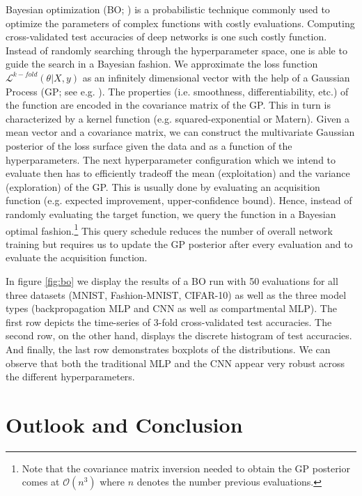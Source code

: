 \documentclass[colorinlistoftodos]{article}
\theoremstyle{definition}
\begin{document}
Bayesian optimization (BO; \citet{snoek_2012}) is a probabilistic technique commonly used to optimize the parameters of complex functions with costly evaluations. Computing cross-validated test accuracies of deep networks is one such costly function. Instead of randomly searching through the hyperparameter space, one is able to guide the search in a Bayesian fashion. We approximate the loss function $\mathcal{L}^{k-fold}(\theta|X, y)$ as an infinitely dimensional vector with the help of a Gaussian Process (GP; see e.g. \citet{rasmussen_2004}). The properties (i.e. smoothness, differentiability, etc.) of the function are encoded in the covariance matrix of the GP. This in turn is characterized by a kernel function (e.g. squared-exponential or Matern). Given a mean vector and a covariance matrix, we can construct the multivariate Gaussian posterior of the loss surface given the data and as a function of the hyperparameters. 
The next hyperparameter configuration which we intend to evaluate then has to efficiently tradeoff the mean (exploitation) and the variance (exploration) of the GP. This is usually done by evaluating an acquisition function (e.g. expected improvement, upper-confidence bound). Hence, instead of randomly evaluating the target function, we query the function in a Bayesian optimal fashion.\footnote{Note that the covariance matrix inversion needed to obtain the GP posterior comes at $\mathcal{O}(n^3)$ where $n$ denotes the number previous evaluations.} This query schedule reduces the number of overall network training but requires us to update the GP posterior after every evaluation and to evaluate the acquisition function.

In figure \ref{fig:bo} we display the results of a BO run with 50 evaluations for all three datasets (MNIST, Fashion-MNIST, CIFAR-10) as well as the three model types (backpropagation MLP and CNN as well as compartmental MLP). The first row depicts the time-series of 3-fold cross-validated test accuracies. The second row, on the other hand, displays the discrete histogram of test accuracies. And finally, the last row demonstrates boxplots of the distributions. We can observe that both the traditional MLP and the CNN appear very robust across the different hyperparameters.

\section{Outlook and Conclusion}
\end{document}
